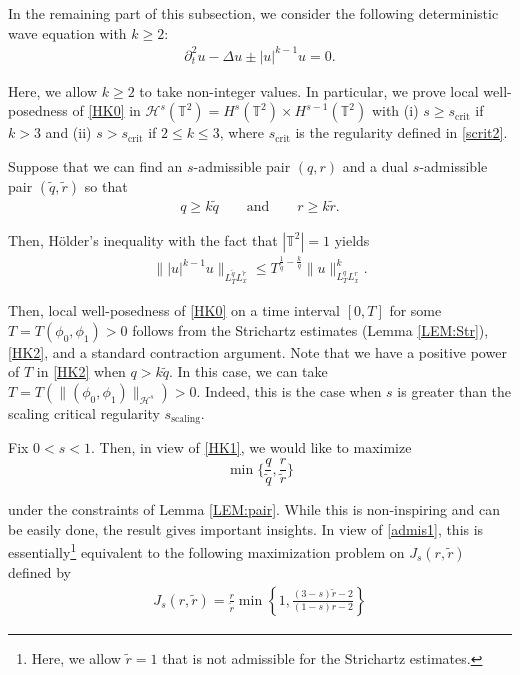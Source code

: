 \documentclass[letterpaper, 11pt,  reqno]{amsart}
\newcommand{\1}{\hspace{0.5mm}\text{I}\hspace{0.5mm}}
\newcommand{\noi}{\noindent}
\newcommand{\T}{\mathbb{T}}
\newcommand{\wt}{\widetilde}
\newcommand{\dt}{\partial_t}
\renewcommand{\H}{\mathcal{H}}
\numberwithin{equation}{section}
\numberwithin{theorem}{section}
\begin{document}
In the remaining part of this subsection, we consider  
 the following  deterministic  wave equation with $k \geq 2$: 
\begin{align}
 \dt^2  u- \Delta u \pm |u|^{k-1} u =0. 
 \label{HK0}
\end{align}

\noi
Here, we allow $k \geq 2$ to take non-integer values.
In particular, we prove local well-posedness of \eqref{HK0}
in $\H^{s} (\T^2) = H^s(\T^2) \times H^{s-1}(\T^2)$ 
with  (i) $s \geq     s_\text{crit}$ if $k >3$ 
and (ii) $s> s_\text{crit}$ if $ 2 \leq k \leq 3$, 
where 
 $ s_\text{crit}$ is the  regularity defined in \eqref{scrit2}.


Suppose that we can find
an $s$-admissible pair $(q,r)$ and a dual $s$-admissible pair $(\wt q,\wt r)$ so that 
\begin{align}
q \ge k \wt q \qquad \text{and} \qquad  r\ge k \wt r. 
\label{HK1}
\end{align}

\noi
Then,  H\"older's inequality with the fact that $|\T^2| = 1$ yields
\begin{align}
  \big\| |u|^{k-1} u \big\|_{L^{\wt q}_T L^{\wt r}_x}
  \le T^{\frac{1}{\wt q}- \frac{k}q} \|  u \|_{L^q_T L^r_x}^k. 
\label{HK2}
\end{align}


\noi
Then, local well-posedness of \eqref{HK0} on 
a time interval $[0, T]$ for some $T = T(\phi_0, \phi_1)> 0$
follows
from  the Strichartz estimates (Lemma \ref{LEM:Str}), 
 \eqref{HK2}, and a standard contraction argument.
Note that we have a positive power of $T$ in \eqref{HK2}
when $q > k \wt q$. 
In this case, we can take $T = T(\| (\phi_0, \phi_1) \|_{\H^s}) > 0$.
Indeed, this is the case when $s$ is greater than the scaling critical regularity $s_\text{scaling}$.

\medskip




Fix  $0<s<1$.
Then, in view of \eqref{HK1},  we would like to  maximize 
\[   \min\Big\{ \frac{q}{\wt q}, \frac{r}{\wt r}  \Big\} \]

\noi
under the constraints of  Lemma \ref{LEM:pair}. 
While this is non-inspiring and can be easily done, 
the result gives important insights. 
In view of \eqref{admis1}, 
this is essentially\footnote{Here, we allow $\wt r =1$ that is not admissible for the Strichartz estimates.} equivalent 
to  the following maximization problem on 
$ J_s(r,\wt r)$ defined by 
\begin{align}
 J_s(r,\wt r) = 
 \frac{r}{\wt r} \min\left\{ 1, \frac{(3-s)\wt r-2 }{(1-s)r -2 } \right\} 
\label{J1}
\end{align}
\end{document}
